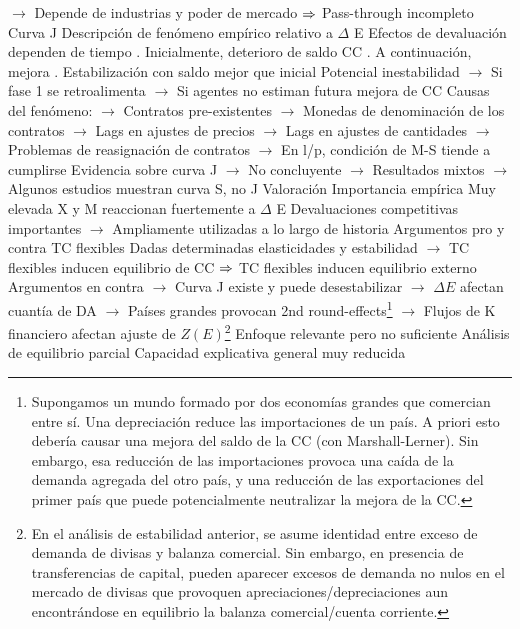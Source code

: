\documentclass{nuevotema}
\begin{document}
\begin{esquemal}
				\4[] $\to$ Depende de industrias y poder de mercado
				\4[] $\Rightarrow$ Pass-through incompleto
				\4 Curva J
				\4[] Descripción de fenómeno empírico relativo a $\Delta$ E
				\4[] Efectos de devaluación dependen de tiempo
				. Inicialmente, deterioro de saldo CC
				. A continuación, mejora
				. Estabilización con saldo mejor que inicial
				\4[] Potencial inestabilidad
				\4[] $\to$ Si fase 1 se retroalimenta
				\4[] $\to$ Si agentes no estiman futura mejora de CC
				\4[] Causas del fenómeno:
				\4[] $\to$ Contratos pre-existentes
				\4[] $\to$ Monedas de denominación de los contratos
				\4[] $\to$ Lags en ajustes de precios
				\4[] $\to$ Lags en ajustes de cantidades
				\4[] $\to$ Problemas de reasignación de contratos
				\4[] $\to$ En l/p, condición de M-S tiende a cumplirse
				\4[] Evidencia sobre curva J
				\4[] $\to$ No concluyente
				\4[] $\to$ Resultados mixtos
				\4[] $\to$ Algunos estudios muestran curva S, no J
				\4[] 
			\3 Valoración
				\4 Importancia empírica
				\4[] Muy elevada
				\4[] X y M reaccionan fuertemente a $\Delta$ E
				\4[] Devaluaciones competitivas importantes
				\4[] $\to$ Ampliamente utilizadas a lo largo de historia
				\4 Argumentos pro y contra TC flexibles
				\4[] Dadas determinadas elasticidades y estabilidad
				\4[] $\to$ TC flexibles inducen equilibrio de CC
				\4[] $\Rightarrow$ TC flexibles inducen equilibrio externo
				\4[] Argumentos en contra
				\4[] $\to$ Curva J existe y puede desestabilizar
				\4[] $\to$ $\Delta E$ afectan cuantía de DA
				\4[] $\to$ Países grandes provocan 2nd round-effects\footnote{Supongamos un mundo formado por dos economías grandes que comercian entre sí. Una depreciación reduce las importaciones de un país. A priori esto debería causar una mejora del saldo de la CC (con Marshall-Lerner). Sin embargo, esa reducción de las importaciones provoca una caída de la demanda agregada del otro país, y una reducción de las exportaciones del primer país que puede potencialmente neutralizar la mejora de la CC.}
				\4[] $\to$ Flujos de K financiero afectan ajuste de $Z(E)$\footnote{En el análisis de estabilidad anterior, se asume identidad entre exceso de demanda de divisas y balanza comercial. Sin embargo, en presencia de transferencias de capital, pueden aparecer excesos de demanda no nulos en el mercado de divisas que provoquen apreciaciones/depreciaciones aun encontrándose en equilibrio la balanza comercial/cuenta corriente.}
				\4 Enfoque relevante pero no suficiente
				\4[] Análisis de equilibrio parcial
				\4[] Capacidad explicativa general muy reducida

\end{esquemal}
\end{document}
